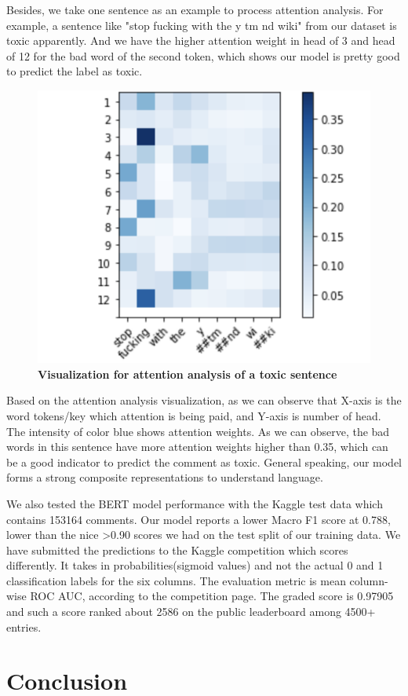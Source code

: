 \documentclass[sigconf]{acmart}
\begin{document}
Besides, we take one sentence as an example to process attention analysis. For example, a sentence like "stop fucking with the y tm nd wiki" from our dataset is toxic apparently. And we have the higher attention weight in head of 3 and head of 12 for the bad word of the second token, which shows our model is pretty good to predict the label as toxic.
\begin{figure}
	\centering
	\includegraphics[width=0.60\linewidth]{p1.png} %
	\caption{\bf{Visualization for attention analysis of a toxic sentence} }
	\label{fig1} %
\end{figure}

Based on the attention analysis visualization, as we can observe that X-axis is the word tokens/key which attention is being paid, and Y-axis is number of head. The intensity of color blue shows attention weights. As we can observe, the bad words in this sentence have more attention weights higher than 0.35, which can be a good indicator to predict the comment as toxic. General speaking, our model forms a strong composite representations to understand language.

We also tested the BERT model performance with the Kaggle test data which contains 153164 comments. Our model reports a lower Macro F1 score at 0.788, lower than the nice >0.90 scores we had on the test split of our training data. We have submitted the predictions to the Kaggle competition which scores differently. It takes in probabilities(sigmoid values) and not the actual 0 and 1 classification labels for the six columns. The evaluation metric is mean column-wise ROC AUC, according to the competition page. The graded score is 0.97905 and such a score ranked about 2586 on the public leaderboard among 4500+ entries.


\section{Conclusion}
\end{document}
